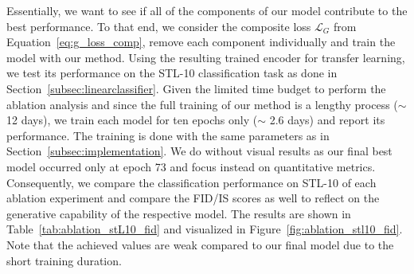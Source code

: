 \documentclass[a4paper,12pt]{report}
\begin{document}
Essentially, we want to see if all of the components of our model contribute to the best performance. To that end, we consider the composite loss $\mathcal{L}_{G}$ from Equation~\ref{eq:g_loss_comp}, remove each component individually and train the model with our method. Using the resulting trained encoder for transfer learning, we test its performance on the STL-10 classification task as done in Section~\ref{subsec:linearclassifier}. Given the limited time budget to perform the ablation analysis and since the full training of our method is a lengthy process ($\sim$ 12 days), we train each model for ten epochs only ($\sim$ 2.6 days) and report its performance. The training is done with the same parameters as in Section~\ref{subsec:implementation}. We do without visual results as our final best model occurred only at epoch 73 and focus instead on quantitative metrics. Consequently, we compare the classification performance on STL-10 of each ablation experiment and compare the FID/IS scores as well to reflect on the generative capability of the respective model. The results are shown in Table~\ref{tab:ablation_stL10_fid} and visualized in Figure~\ref{fig:ablation_stl10_fid}. Note that the achieved values are weak compared to our final model due to the short training duration.
\end{document}
